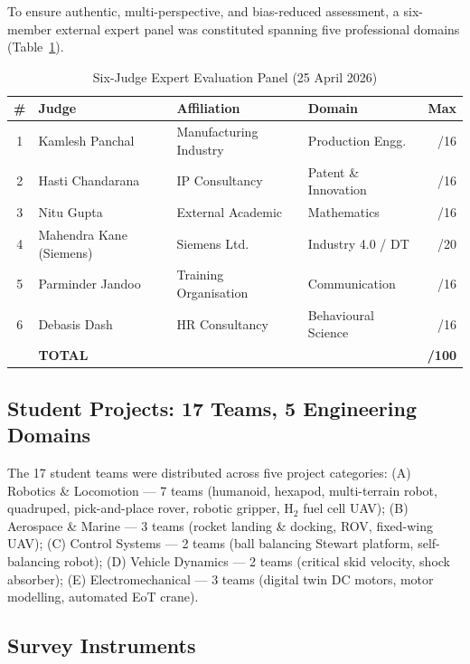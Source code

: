 \documentclass[12pt, a4paper]{article}
\begin{document}
To ensure authentic, multi-perspective, and bias-reduced
assessment, a six-member external expert panel was constituted
spanning five professional domains (Table~\ref{tab:judges}).

\begin{table}[ht]
\centering
\caption{Six-Judge Expert Evaluation Panel (25 April 2026)}
\label{tab:judges}
\begin{tabular}{clllr}
\toprule
\textbf{\#} & \textbf{Judge} & \textbf{Affiliation} &
\textbf{Domain} & \textbf{Max} \\
\midrule
1 & Kamlesh Panchal         & Manufacturing Industry & Production Engg.    & /16 \\
2 & Hasti Chandarana         & IP Consultancy         & Patent \& Innovation & /16 \\
3 & Nitu Gupta               & External Academic      & Mathematics          & /16 \\
4 & Mahendra Kane (Siemens)  & Siemens Ltd.           & Industry 4.0 / DT    & /20 \\
5 & Parminder Jandoo         & Training Organisation  & Communication        & /16 \\
6 & Debasis Dash             & HR Consultancy         & Behavioural Science  & /16 \\
\midrule
  & \textbf{TOTAL}           &                        &                      & \textbf{/100} \\
\bottomrule
\end{tabular}
\end{table}

\subsection{Student Projects: 17 Teams, 5 Engineering Domains}

The 17 student teams were distributed across five project
categories: (A) Robotics \& Locomotion --- 7 teams (humanoid,
hexapod, multi-terrain robot, quadruped, pick-and-place rover,
robotic gripper, H$_2$ fuel cell UAV); (B) Aerospace \& Marine
--- 3 teams (rocket landing \& docking, ROV, fixed-wing UAV);
(C) Control Systems --- 2 teams (ball balancing Stewart platform,
self-balancing robot); (D) Vehicle Dynamics --- 2 teams (critical
skid velocity, shock absorber); (E) Electromechanical --- 3 teams
(digital twin DC motors, motor modelling, automated EoT crane).

\subsection{Survey Instruments}
\end{document}
